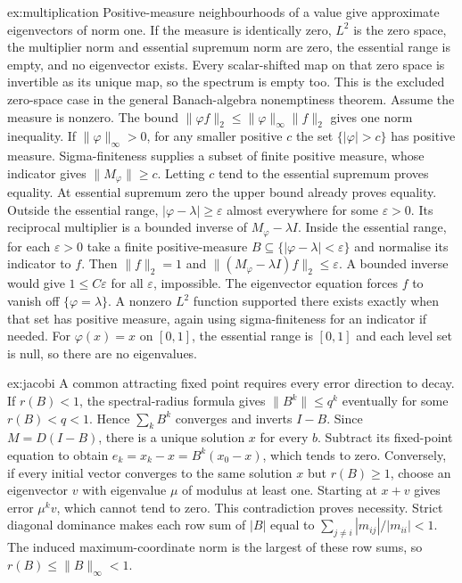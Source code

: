 \begin{solution}{ex:multiplication}
\idea Positive-measure neighbourhoods of a value give approximate eigenvectors of norm one.
\writeup If the measure is identically zero, $L^2$ is the zero space, the multiplier norm and essential supremum norm are zero, the essential range is empty, and no eigenvector exists. Every scalar-shifted map on that zero space is invertible as its unique map, so the spectrum is empty too. This is the excluded zero-space case in the general Banach-algebra nonemptiness theorem.
Assume the measure is nonzero. The bound $\|\varphi f\|_2\le\|\varphi\|_\infty\|f\|_2$ gives one norm inequality. If $\|\varphi\|_\infty>0$, for any smaller positive $c$ the set $\{|\varphi|>c\}$ has positive measure. Sigma-finiteness supplies a subset of finite positive measure, whose indicator gives $\|M_\varphi\|\ge c$. Letting $c$ tend to the essential supremum proves equality. At essential supremum zero the upper bound already proves equality.
Outside the essential range, $|\varphi-\lambda|\ge\varepsilon$ almost everywhere for some $\varepsilon>0$. Its reciprocal multiplier is a bounded inverse of $M_\varphi-\lambda I$. Inside the essential range, for each $\varepsilon>0$ take a finite positive-measure $B\subseteq\{|\varphi-\lambda|<\varepsilon\}$ and normalise its indicator to $f$. Then $\|f\|_2=1$ and $\|(M_\varphi-\lambda I)f\|_2\le\varepsilon$. A bounded inverse would give $1\le C\varepsilon$ for all $\varepsilon$, impossible.
The eigenvector equation forces $f$ to vanish off $\{\varphi=\lambda\}$. A nonzero $L^2$ function supported there exists exactly when that set has positive measure, again using sigma-finiteness for an indicator if needed. For $\varphi(x)=x$ on $[0,1]$, the essential range is $[0,1]$ and each level set is null, so there are no eigenvalues.
\end{solution}

\begin{solution}{ex:jacobi}
\idea A common attracting fixed point requires every error direction to decay.
\writeup If $r(B)<1$, the spectral-radius formula gives $\|B^k\|\le q^k$ eventually for some $r(B)<q<1$. Hence $\sum_kB^k$ converges and inverts $I-B$. Since $M=D(I-B)$, there is a unique solution $x$ for every $b$. Subtract its fixed-point equation to obtain $e_k=x_k-x=B^k(x_0-x)$, which tends to zero.
Conversely, if every initial vector converges to the same solution $x$ but $r(B)\ge1$, choose an eigenvector $v$ with eigenvalue $\mu$ of modulus at least one. Starting at $x+v$ gives error $\mu^kv$, which cannot tend to zero. This contradiction proves necessity.
Strict diagonal dominance makes each row sum of $|B|$ equal to $\sum_{j\ne i}|m_{ij}|/|m_{ii}|<1$. The induced maximum-coordinate norm is the largest of these row sums, so $r(B)\le\|B\|_\infty<1$.
\end{solution}

